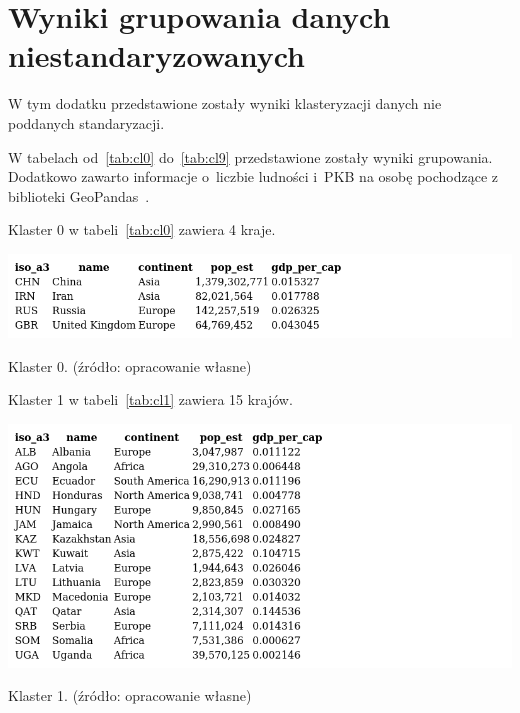 \documentclass[11pt]{report}
\begin{document}
    \chapter[Wyniki grupowania]{Wyniki grupowania danych niestandaryzowanych}\label{ch:dodatek_niestd}
    W tym dodatku przedstawione zostały wyniki klasteryzacji danych nie poddanych standaryzacji.

    W tabelach od~\ref{tab:cl0} do~\ref{tab:cl9} przedstawione zostały wyniki grupowania.
    Dodatkowo zawarto informacje o~liczbie ludności i~PKB na osobę pochodzące z biblioteki GeoPandas~\cite{geopandas}.

    Klaster 0 w tabeli~\ref{tab:cl0} zawiera 4 kraje.
    \begin{table}[!htp]
        \centering
        \includegraphics[width=\linewidth]{tables/CLUST/clust0kmeans.png}
        \caption{Klaster 0. (źródło: opracowanie własne)}
        \label{tab:cl0}
    \end{table}

    Klaster 1 w tabeli~\ref{tab:cl1} zawiera 15 krajów.
    \begin{table}[!htp]
        \centering
        \includegraphics[width=\linewidth]{tables/CLUST/clust1kmeans.png}
        \caption{Klaster 1. (źródło: opracowanie własne)}
        \label{tab:cl1}
    \end{table}
\end{document}
